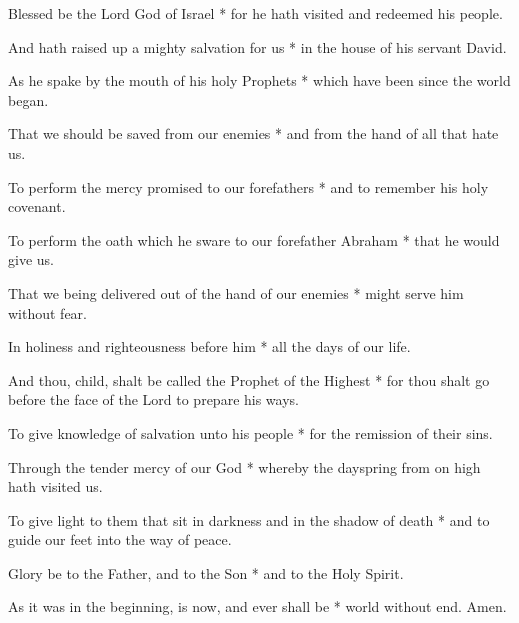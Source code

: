 Blessed be the Lord God of Israel * for he hath visited and redeemed his people.

And hath raised up a mighty salvation for us * in the house of his servant David.

As he spake by the mouth of his holy Prophets * which have been since the world began.

That we should be saved from our enemies * and from the hand of all that hate us.

To perform the mercy promised to our forefathers * and to remember his holy covenant.

To perform the oath which he sware to our forefather Abraham * that he would give us.

That we being delivered out of the hand of our enemies * might serve him without fear.

In holiness and righteousness before him * all the days of our life.

And thou, child, shalt be called the Prophet of the Highest * for thou shalt go before the face of the Lord to prepare his ways.

To give knowledge of salvation unto his people * for the remission of their sins.

Through the tender mercy of our God * whereby the dayspring from on high hath visited us.

To give light to them that sit in darkness and in the shadow of death * and to guide our feet into the way of peace.

Glory be to the Father, and to the Son * and to the Holy Spirit.

As it was in the beginning, is now, and ever shall be * world without end. Amen.